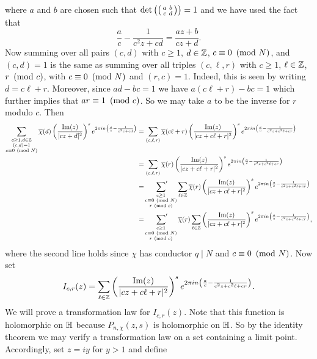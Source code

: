     where $a$ and $b$ are chosen such that $\det\left(\begin{psmallmatrix} a & b \\ c & d \end{psmallmatrix}\right) = 1$ and we have used the fact that
    \[
      \frac{a}{c}-\frac{1}{c^{2}z+cd} = \frac{az+b}{cz+d}.
    \]
    Now summing over all pairs $(c,d)$ with $c \ge 1$, $d \in \mathbb{Z}$, $c \equiv 0 \ \left(\text{mod }N\right)$, and $(c,d) = 1$ is the same as summing over all triples $(c,\ell,r)$ with $c \ge 1$, $\ell \in \mathbb{Z}$, $r \ \left(\text{mod }c\right)$, with $c \equiv 0 \ \left(\text{mod }N\right)$ and $(r,c) = 1$. Indeed, this is seen by writing $d = c\ell+r$. Moreover, since $ad-bc = 1$ we have $a(c\ell+r)-bc = 1$ which further implies that $ar \equiv 1 \ \left(\text{mod }c\right)$. So we may take $a$ to be the inverse for $r$ modulo $c$. Then
    \begin{align*}
      \sum_{\substack{c \ge 1,d \in \mathbb{Z} \\ (c,d) = 1 \\ c \equiv 0 \ \left(\text{mod }N\right)}}\overline{\chi}(d)\left(\frac{\mathrm{Im}(z)}{|cz+d|^{2}}\right)^{s}e^{2\pi in\left(\frac{a}{c}-\frac{1}{c^{2}z+cd}\right)} &= \sum_{(c,\ell,r)}\overline{\chi}(c\ell+r)\left(\frac{\mathrm{Im}(z)}{|cz+c\ell+r|^{2}}\right)^{s}e^{2\pi in\left(\frac{a}{c}-\frac{1}{c^{2}z+c^{2}\ell+cr}\right)} \\
      &= \sum_{(c,\ell,r)}\overline{\chi}(r)\left(\frac{\mathrm{Im}(z)}{|cz+c\ell+r|^{2}}\right)^{s}e^{2\pi in\left(\frac{a}{c}-\frac{1}{c^{2}z+c^{2}\ell+cr}\right)} \\
      &= \sideset{}{'}\sum_{\substack{c \ge 1 \\ c \equiv 0 \ \left(\text{mod }N\right) \\ r \ \left(\text{mod }c\right)}}\sum_{\ell \in \mathbb{Z}}\overline{\chi}(r)\left(\frac{\mathrm{Im}(z)}{|cz+c\ell+r|^{2}}\right)^{s}e^{2\pi in\left(\frac{a}{c}-\frac{1}{c^{2}z+c^{2}\ell+cr}\right)} \\
      &= \sideset{}{'}\sum_{\substack{c \ge 1 \\ c \equiv 0 \ \left(\text{mod }N\right) \\ r \ \left(\text{mod }c\right)}}\overline{\chi}(r)\sum_{\ell \in \mathbb{Z}}\left(\frac{\mathrm{Im}(z)}{|cz+c\ell+r|^{2}}\right)^{s}e^{2\pi in\left(\frac{a}{c}-\frac{1}{c^{2}z+c^{2}\ell+cr}\right)},
    \end{align*}
    where the second line holds since $\chi$ has conductor $q \mid N$ and $c \equiv 0 \ \left(\text{mod }N\right)$. Now set
    \[
      I_{c,r}(z) = \sum_{\ell \in \mathbb{Z}}\left(\frac{\mathrm{Im}(z)}{|cz+c\ell+r|^{2}}\right)^{s}e^{2\pi in\left(\frac{a}{c}-\frac{1}{c^{2}z+c^{2}\ell+cr}\right)}.
    \]
    We will prove a transformation law for $I_{c,r}(z)$. Note that this function is holomorphic on $\mathbb{H}$ because $P_{n,\chi}(z,s)$ is holomorphic on $\mathbb{H}$. So by the identity theorem we may verify a transformation law on a set containing a limit point. Accordingly, set $z = iy$ for $y > 1$ and define
